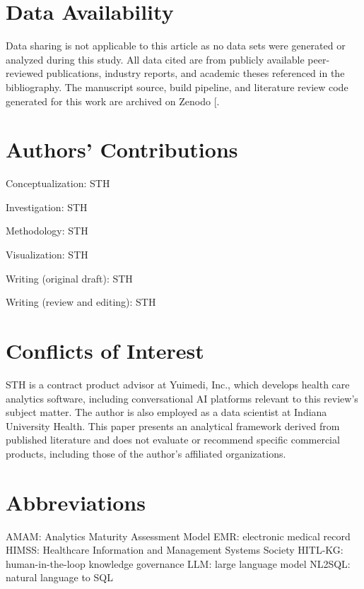 \documentclass[
  american,
  11pt,
  letterpaper,
  oneside  ,captions=tableheading
]{scrartcl}
\begin{document}
\section{Data Availability}\label{data-availability}

Data sharing is not applicable to this article as no data sets were
generated or analyzed during this study. All data cited are from
publicly available peer-reviewed publications, industry reports, and
academic theses referenced in the bibliography. The manuscript source,
build pipeline, and literature review code generated for this work are
archived on Zenodo {[}\citeproc{ref-harrold2026zenodo}{85}{]}.

\section{Authors' Contributions}\label{authors-contributions}

Conceptualization: STH

Investigation: STH

Methodology: STH

Visualization: STH

Writing (original draft): STH

Writing (review and editing): STH

\section{Conflicts of Interest}\label{conflicts-of-interest}

STH is a contract product advisor at Yuimedi, Inc., which develops
health care analytics software, including conversational AI platforms
relevant to this review's subject matter. The author is also employed as
a data scientist at Indiana University Health. This paper presents an
analytical framework derived from published literature and does not
evaluate or recommend specific commercial products, including those of
the author's affiliated organizations.

\section{Abbreviations}\label{abbreviations}

AMAM: Analytics Maturity Assessment Model EMR: electronic medical record
HIMSS: Healthcare Information and Management Systems Society HITL-KG:
human-in-the-loop knowledge governance LLM: large language model NL2SQL:
natural language to SQL
\end{document}
